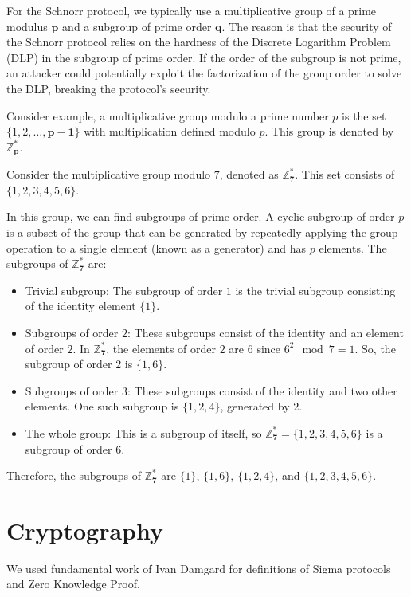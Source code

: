 For the Schnorr protocol, we typically use a multiplicative group of a prime modulus $\boldsymbol{p}$ and a subgroup of prime order $\boldsymbol{q}$. The reason is that the security of the Schnorr protocol relies on the hardness of the Discrete Logarithm Problem (DLP) in the subgroup of prime order. If the order of the subgroup is not prime, an attacker could potentially exploit the factorization of the group order to solve the DLP, breaking the protocol's security.

Consider example, a multiplicative group modulo a prime number $p$ is the set $\{{1}, {2}, \ldots, \boldsymbol{p-1}\}$ with multiplication defined modulo $p$. This group is denoted by $\mathbb{Z}_{\boldsymbol{p}}^{*}$. 

Consider the multiplicative group modulo $7$, denoted as $\mathbb{Z}_{\boldsymbol{7}}^{*}$. This set consists of $\{{1}, {2}, {3}, {4}, {5}, {6}\}$. 

In this group, we can find subgroups of prime order. A cyclic subgroup of order $p$ is a subset of the group that can be generated by repeatedly applying the group operation to a single element (known as a generator) and has $p$ elements. The subgroups of $\mathbb{Z}_{\boldsymbol{7}}^{*}$ are:

\begin{itemize}
    \item Trivial subgroup: The subgroup of order $1$ is the trivial subgroup consisting of the identity element $\{{1}\}$.
    \item Subgroups of order $2$: These subgroups consist of the identity and an element of order $2$. In $\mathbb{Z}_{\boldsymbol{7}}^{*}$, the elements of order $2$ are ${6}$ since $6^{2} \mod 7 = 1$. So, the subgroup of order $2$ is $\{{1}, {6}\}$.
    \item Subgroups of order $3$: These subgroups consist of the identity and two other elements. One such subgroup is $\{{1}, {2}, {4}\}$, generated by $2$.
    \item The whole group: This is a subgroup of itself, so $\mathbb{Z}_{\boldsymbol{7}}^{*} = \{{1}, {2}, {3}, {4}, {5}, {6}\}$ is a subgroup of order $6$.
\end{itemize}

Therefore, the subgroups of $\mathbb{Z}_{\boldsymbol{7}}^{*}$ are $\{{1}\}$, $\{{1}, {6}\}$, $\{{1}, {2}, {4}\}$, and $\{{1}, {2}, {3}, {4}, {5}, {6}\}$.

\section{Cryptography}
We used fundamental work of Ivan Damgard \cite{damgaard2010sigma} for definitions of Sigma protocols and Zero Knowledge Proof.

